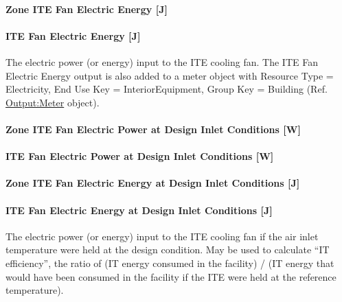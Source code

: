 \paragraph{Zone ITE Fan Electric Energy {[}J{]}}\label{zone-ite-fan-electric-energy-j}

\paragraph{ITE Fan Electric Energy {[}J{]}}\label{ite-fan-electric-energy-j}

The electric power (or energy) input to the ITE cooling fan. The ITE Fan Electric Energy output is also added to a meter object with Resource Type = Electricity, End Use Key = InteriorEquipment, Group Key = Building (Ref. \hyperref[outputmeter-and-outputmetermeterfileonly]{Output:Meter} object).

\paragraph{Zone ITE Fan Electric Power at Design Inlet Conditions {[}W{]}}\label{zone-ite-fan-electric-power-at-design-inlet-conditions-w}

\paragraph{ITE Fan Electric Power at Design Inlet Conditions {[}W{]}}\label{ite-fan-electric-power-at-design-inlet-conditions-w}

\paragraph{Zone ITE Fan Electric Energy at Design Inlet Conditions {[}J{]}}\label{zone-ite-fan-electric-energy-at-design-inlet-conditions-j}

\paragraph{ITE Fan Electric Energy at Design Inlet Conditions {[}J{]}}\label{ite-fan-electric-energy-at-design-inlet-conditions-j}

The electric power (or energy) input to the ITE cooling fan if the air inlet temperature were held at the design condition. May be used to calculate ``IT efficiency'', the ratio of (IT energy consumed in the facility) / (IT energy that would have been consumed in the facility if the ITE were held at the reference temperature).

